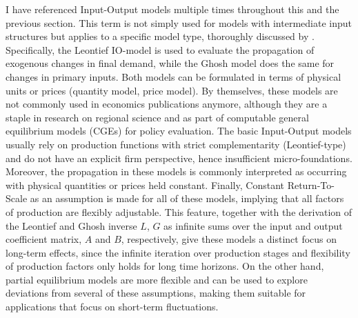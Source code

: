 I have referenced Input-Output models multiple times throughout this and the previous section. This term is not simply used for models 
with intermediate input structures but applies to a specific model type, thoroughly discussed by 
\textcite{miller2009InputoutputAnalysisFoundations}. Specifically, the Leontief IO-model is used to evaluate the propagation of 
exogenous changes in final demand, while the Ghosh model does the same for changes in primary inputs. Both models can be formulated in 
terms of physical units or prices (quantity model, price model). By themselves, these models are not commonly used in economics 
publications anymore, although they are a staple in research on regional science and as part of computable general equilibrium models 
(CGEs) for policy evaluation. The basic Input-Output models usually rely on production functions with strict complementarity 
(Leontief-type) and do not have an explicit firm perspective, hence insufficient micro-foundations. Moreover, the propagation in these 
models is commonly interpreted as occurring with physical quantities or prices held constant. Finally, Constant Return-To-Scale as an 
assumption is made for all of these models, implying that all factors of production are flexibly adjustable. This feature, 
together with the derivation of the Leontief and Ghosh inverse $L$, $G$ as infinite sums over the input and output coefficient matrix, 
$A$ and $B$, respectively, give these models a distinct focus on long-term effects, since the infinite iteration over production stages 
and flexibility of production factors only holds for long time horizons. On the other hand, partial equilibrium models are more flexible 
and can be used to explore deviations from several of these assumptions, making them suitable for applications that focus on short-term 
fluctuations.


